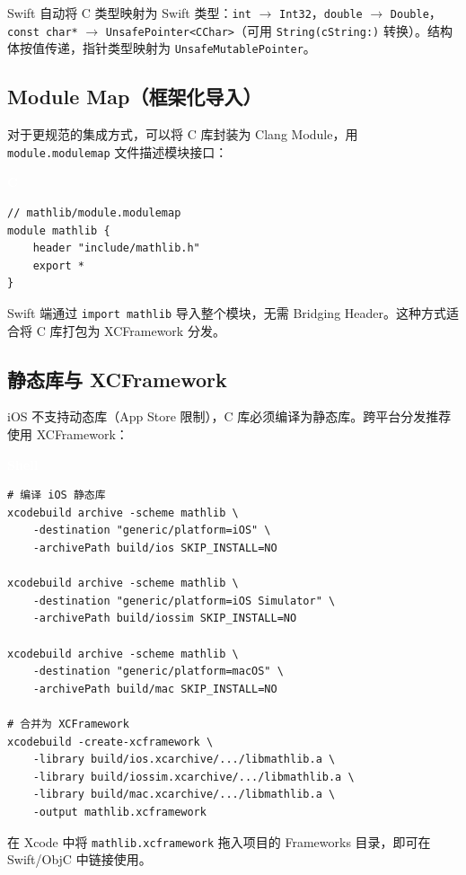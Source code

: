\documentclass[12pt,a4paper,fontset=fandol]{ctexbook}
\newcommand{\clabel}{%
  \begin{tcolorbox}[enhanced,colback=cheadbg,colframe=cheadbg,
    arc=1mm,boxrule=0mm,left=6pt,right=6pt,top=2pt,bottom=2pt,
    halign=left,oversize]
    \textcolor{white}{\small\bfseries C}
  \end{tcolorbox}\vspace{-4pt}}
\newcommand{\bashlabel}{%
  \begin{tcolorbox}[enhanced,colback=black!80,colframe=black!80,
    arc=1mm,boxrule=0mm,left=6pt,right=6pt,top=2pt,bottom=2pt,
    halign=left,oversize]
    \textcolor{white}{\small\bfseries Shell}
  \end{tcolorbox}\vspace{-4pt}}
\begin{document}
\begin{tcolorbox}[note={Swift 对 C 类型的映射}]
Swift 自动将 C 类型映射为 Swift 类型：\texttt{int} $\to$ \texttt{Int32}，\texttt{double} $\to$ \texttt{Double}，\texttt{const char*} $\to$ \texttt{UnsafePointer<CChar>}（可用 \texttt{String(cString:)} 转换）。结构体按值传递，指针类型映射为 \texttt{UnsafeMutablePointer}。
\end{tcolorbox}

\subsection{Module Map（框架化导入）}

对于更规范的集成方式，可以将 C 库封装为 Clang Module，用 \texttt{module.modulemap} 文件描述模块接口：

\clabel
\begin{lstlisting}[style=cstyle]
// mathlib/module.modulemap
module mathlib {
    header "include/mathlib.h"
    export *
}
\end{lstlisting}

Swift 端通过 \texttt{import mathlib} 导入整个模块，无需 Bridging Header。这种方式适合将 C 库打包为 XCFramework 分发。

\subsection{静态库与 XCFramework}

iOS 不支持动态库（App Store 限制），C 库必须编译为静态库。跨平台分发推荐使用 XCFramework：

\bashlabel
\begin{lstlisting}[style=bashstyle]
# 编译 iOS 静态库
xcodebuild archive -scheme mathlib \
    -destination "generic/platform=iOS" \
    -archivePath build/ios SKIP_INSTALL=NO

xcodebuild archive -scheme mathlib \
    -destination "generic/platform=iOS Simulator" \
    -archivePath build/iossim SKIP_INSTALL=NO

xcodebuild archive -scheme mathlib \
    -destination "generic/platform=macOS" \
    -archivePath build/mac SKIP_INSTALL=NO

# 合并为 XCFramework
xcodebuild -create-xcframework \
    -library build/ios.xcarchive/.../libmathlib.a \
    -library build/iossim.xcarchive/.../libmathlib.a \
    -library build/mac.xcarchive/.../libmathlib.a \
    -output mathlib.xcframework
\end{lstlisting}

在 Xcode 中将 \texttt{mathlib.xcframework} 拖入项目的 Frameworks 目录，即可在 Swift/ObjC 中链接使用。
\end{document}
